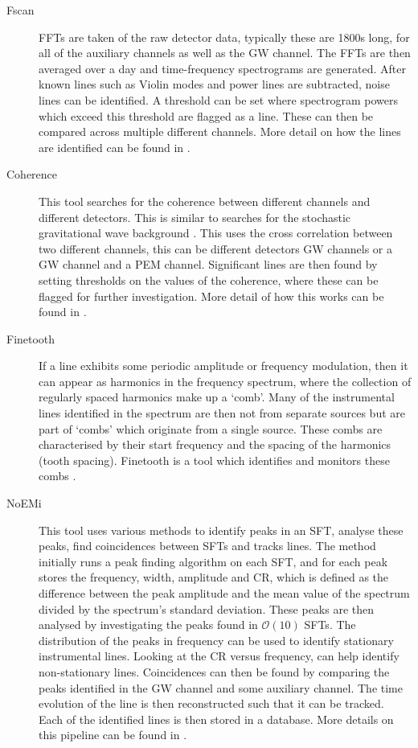 \begin{description}
	\item[Fscan] \Glspl{FFT} are taken of the raw detector data, typically these are 1800s long, for all of the auxiliary channels as well as the \gls{GW} channel.
	The \glspl{FFT} are then averaged over a day and time-frequency spectrograms
	are generated. After known lines such as Violin modes and power lines are
	subtracted, noise lines can be identified. A threshold can be set where spectrogram powers which exceed this threshold are flagged as a line. These
	can then be compared across multiple different channels. More detail on how the
	lines are identified can be found in \citep{coughlin2010NoiseLine}.
	
    \item[Coherence] This tool searches for the coherence between different
	channels and different detectors. This is similar to searches for the stochastic
	gravitational wave background \citep{allen1999DetectingStochastic}. This uses the cross correlation between two different channels, this can be different detectors \gls{GW} channels or a \gls{GW} channel and a \gls{PEM} channel. 
	Significant lines are then found by setting thresholds on the values of the coherence, where these can be flagged for further investigation.
	More detail of how this works can be found in \citep{covas2018IdentificationMitigation,coughlin2010NoiseLine,}.
	
	\item[Finetooth] If a line exhibits some periodic amplitude or frequency modulation, then it can appear as harmonics in the frequency spectrum, where the collection of regularly spaced harmonics make up a `comb'. 
	Many of the instrumental lines identified in the spectrum are then not from separate sources but are part of `combs' which originate from a single source. 
	These combs are characterised by their start frequency and the spacing of the harmonics (tooth spacing).
	Finetooth is a tool which identifies and monitors these combs \citep{neunzertDailyComb}.

	
	\item[\Gls{NoEMi}] This tool uses various methods to identify peaks in an \gls{SFT}, analyse these peaks, find coincidences between \glspl{SFT} and tracks lines. 
	The method initially runs a peak finding algorithm on each \gls{SFT}, and for each peak stores the frequency, width, amplitude and \gls{CR}, which is defined as the difference between the peak amplitude and the mean value of the spectrum divided by the spectrum's standard deviation.
	These peaks are then analysed by investigating the peaks found in $\mathcal{O}(10)$ \glspl{SFT}. 
	The distribution of the peaks in frequency can be used to identify stationary instrumental lines. 
	Looking at the \gls{CR} versus frequency, can help identify non-stationary lines.
	Coincidences can then be found by comparing the peaks identified in the \gls{GW} channel and some auxiliary channel. 
	The time evolution of the line is then reconstructed such that it can be tracked.
	Each of the identified lines is then stored in a database.
	More details on this pipeline can be found in \citep{accadia2012NoEMiNoise}.


\end{description}

